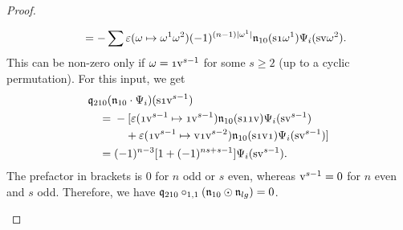 \documentclass[\MainFolder/Text.tex]{subfiles}
\begin{document}
\begin{proof}
\begin{description}[font=\normalfont\itshape]
\begin{align*}
 & \qquad = - \sum \varepsilon(\omega\mapsto \omega^1 \omega^2)(-1)^{(n-1)\Abs{\omega^1}} \PMC_{10}(\Susp \NOne \omega^1) \Psi_i(\Susp \NVol \omega^2).
\end{align*}
This can be non-zero only if $\omega = \NOne \NVol^{s-1}$ for some $s\ge 2$ (up to a cyclic permutation). For this input, we get
\allowdisplaybreaks
\begin{align*} &\OPQ_{210}(\PMC_{10}\cdot \Psi_i)(\Susp \NOne \NVol^{s-1}) \\ &\quad = \begin{multlined}[t] -[\varepsilon(\NOne \NVol^{s-1} \mapsto \NOne\NVol^{s-1})\PMC_{10}(\Susp \NOne\NOne\NVol)\Psi_i(\Susp\NVol^{s-1}) \\ {}+ \varepsilon(\NOne \NVol^{s-1} \mapsto \NVol\NOne\NVol^{s-2})\PMC_{10}(\Susp \NOne\NVol\NOne)  \Psi_i(\Susp\NVol^{s-1})] \end{multlined} \\
 &\quad= (-1)^{n-3}[1+(-1)^{ns+s-1}] \Psi_i(\Susp\NVol^{s-1}).
\end{align*}
The prefactor in brackets is $0$ for $n$ odd or $s$ even, whereas $\mathrm{v}^{s-1} = 0$ for $n$ even and $s$ odd. Therefore,  we have $\mathfrak{q}_{210}\circ_{1,1} (\mathfrak{n}_{10}\odot \mathfrak{n}_{lg}) = 0$. \qedhere
\end{description}
\end{proof}

\end{document}
